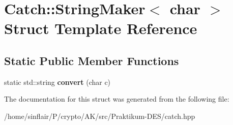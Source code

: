 \hypertarget{structCatch_1_1StringMaker_3_01char_01_4}{}\section{Catch\+:\+:String\+Maker$<$ char $>$ Struct Template Reference}
\label{structCatch_1_1StringMaker_3_01char_01_4}
\subsection*{Static Public Member Functions}
\begin{DoxyCompactItemize}
\item 
\mbox{\label{structCatch_1_1StringMaker_3_01char_01_4_a4e3db69a12bb83f3ef89251893e65da5}} 
static std\+::string {\bfseries convert} (char c)
\end{DoxyCompactItemize}


The documentation for this struct was generated from the following file\+:\begin{DoxyCompactItemize}
\item 
/home/sinflair/\+P/crypto/\+A\+K/src/\+Praktikum-\/\+D\+E\+S/catch.\+hpp\end{DoxyCompactItemize}
